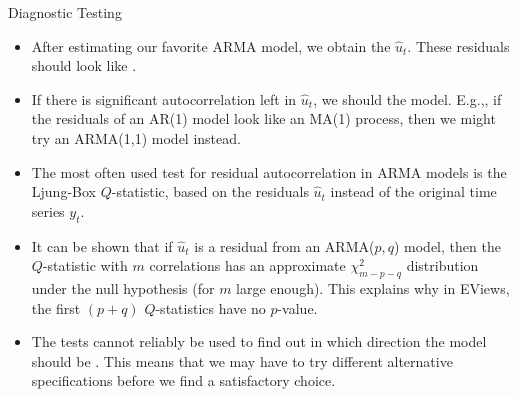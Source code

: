 \begin{frame}{Diagnostic Testing}
\begin{itemize}
\item
After estimating our favorite ARMA model, we obtain the  $\hat{u}%
_{t}$. These residuals should look like
.
\item If there is significant
autocorrelation left in $\hat{u}_{t}$, we should
 the model. E.g.,, if the residuals of an
AR(1) model look like an MA(1) process, then we might try an ARMA(1,1) model
instead.
\item The most often used test for residual autocorrelation in ARMA models is the
Ljung-Box $Q$-statistic, based on the residuals $\hat{u}_{t}$ instead of the
original time series $y_{t}$.
\item It can be shown that if $\hat{u}_{t}$ is a
residual from an ARMA($p,q$) model, then the $Q$-statistic with $m$
correlations has an approximate $\chi _{m-p-q}^{2}$ distribution under the
null hypothesis (for $m$ large enough). This explains why in EViews, the
first $(p+q)$ $Q$-statistics have no $p$-value.

\item The tests cannot reliably be used to
find out in which direction the model should be . This means
that we may have to try different alternative specifications before we find
a satisfactory choice.
\end{itemize}
\end{frame}
